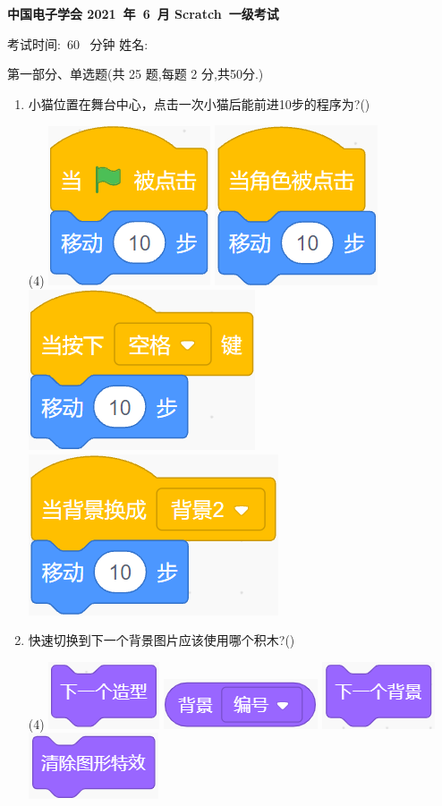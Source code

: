\documentclass[10pt, a4paper]{article}
\newcommand{\Title}[3]{
    \begin{center}
        \Large \textbf{中国电子学会 #1~年~#2~月 Scratch~#3级考试}
    \end{center}
}
\newcommand{\TimeAndName}[1]{
    \begin{center}
        考试时间:~#1~ 分钟 \qquad\qquad\qquad\qquad 姓名:\underline{\quad\quad\quad\quad}
    \end{center}
}
\begin{document}
    \Title{2021}{6}{一}
    
    \TimeAndName{60}
    
    {\noindent\heiti 第一部分、单选题(共 25 题,每题 2 分,共50分.)}

    \begin{enumerate}
        \item 小猫位置在舞台中心，点击一次小猫后能前进10步的程序为?(\qquad)
        \begin{tasks}(4)
            \task \includegraphics[width=.1\textwidth]{1a.png}
            \task \includegraphics[width=.1\textwidth]{1b.png}
            \task \includegraphics[width=.14\textwidth]{1c.png}
            \task \includegraphics[width=.15\textwidth]{1d.png}
        \end{tasks}

        \item 快速切换到下一个背景图片应该使用哪个积木?(\qquad)
        \begin{tasks}(4)
            \task \includegraphics[width=.08\textwidth]{2a.png}
            \task \includegraphics[width=.12\textwidth]{2b.png}
            \task \includegraphics[width=.08\textwidth]{2c.png}
            \task \includegraphics[width=.1\textwidth]{2d.png}
        \end{tasks}


\end{enumerate}
\end{document}
